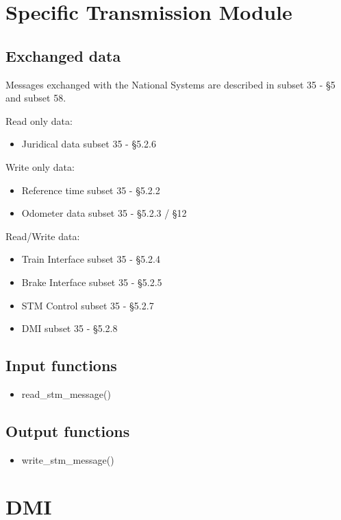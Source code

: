 \documentclass{template/openetcs_article}
\begin{document}
\section{Specific Transmission Module}
	\subsection{Exchanged data}
		Messages exchanged with the National Systems are described in subset 35 - §5 and subset 58.
		
		Read only data:
		\begin{itemize}
			\item Juridical data
				\subitem subset 35 - §5.2.6
		\end{itemize}
		
		Write only data:
		\begin{itemize}
			\item Reference time
				\subitem subset 35 - §5.2.2
			\item Odometer data
				\subitem subset 35 - §5.2.3 / §12
		\end{itemize}
		
		Read/Write data:
		\begin{itemize}
			\item Train Interface
				\subitem subset 35 - §5.2.4
			\item Brake Interface
				\subitem subset 35 - §5.2.5
			\item STM Control
				\subitem subset 35 - §5.2.7
			\item DMI
				\subitem subset 35 - §5.2.8
				
		\end{itemize}
		
	\subsection{Input functions}
		\begin{itemize}
			\item read\_stm\_message()
		\end{itemize}
	\subsection{Output functions}
		\begin{itemize}
			\item write\_stm\_message()
		\end{itemize}
		
\section{DMI}
\end{document}
